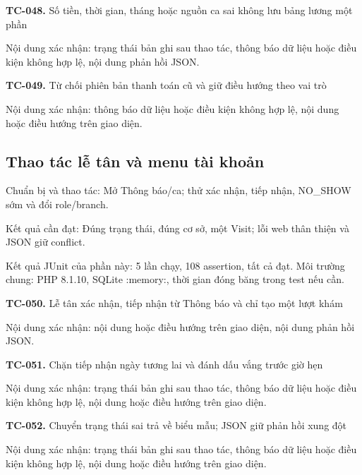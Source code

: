 \noindent\textbf{TC-048.} Số tiền, thời gian, tháng hoặc nguồn ca sai không lưu bảng lương một phần\par
Nội dung xác nhận:\allowbreak{} trạng thái bản ghi sau thao tác, thông báo dữ liệu hoặc điều kiện không hợp lệ, nội dung phản hồi JSON.\allowbreak{}

\noindent\textbf{TC-049.} Từ chối phiên bản thanh toán cũ và giữ điều hướng theo vai trò\par
Nội dung xác nhận:\allowbreak{} thông báo dữ liệu hoặc điều kiện không hợp lệ, nội dung hoặc điều hướng trên giao diện.\allowbreak{}


\par\vspace{8pt}

\subsection{Thao tác lễ tân và menu tài khoản}
Chuẩn bị và thao tác:\allowbreak{} Mở Thông báo/\allowbreak{}ca; thử xác nhận, tiếp nhận, NO\_\allowbreak{}SHOW sớm và đổi role/\allowbreak{}branch.\allowbreak{}

Kết quả cần đạt:\allowbreak{} Đúng trạng thái, đúng cơ sở, một Visit; lỗi web thân thiện và JSON giữ conflict.\allowbreak{}

Kết quả JUnit của phần này:\allowbreak{} 5 lần chạy, 108 assertion, tất cả đạt.\allowbreak{} Môi trường chung:\allowbreak{} PHP 8.\allowbreak{}1.\allowbreak{}10, SQLite :\allowbreak{}memory:\allowbreak{}, thời gian đóng băng trong test nếu cần.\allowbreak{}

\noindent\textbf{TC-050.} Lễ tân xác nhận, tiếp nhận từ Thông báo và chỉ tạo một lượt khám\par
Nội dung xác nhận:\allowbreak{} nội dung hoặc điều hướng trên giao diện, nội dung phản hồi JSON.\allowbreak{}

\noindent\textbf{TC-051.} Chặn tiếp nhận ngày tương lai và đánh dấu vắng trước giờ hẹn\par
Nội dung xác nhận:\allowbreak{} trạng thái bản ghi sau thao tác, thông báo dữ liệu hoặc điều kiện không hợp lệ, nội dung hoặc điều hướng trên giao diện.\allowbreak{}

\noindent\textbf{TC-052.} Chuyển trạng thái sai trả về biểu mẫu; JSON giữ phản hồi xung đột\par
Nội dung xác nhận:\allowbreak{} trạng thái bản ghi sau thao tác, thông báo dữ liệu hoặc điều kiện không hợp lệ, nội dung hoặc điều hướng trên giao diện.\allowbreak{}

